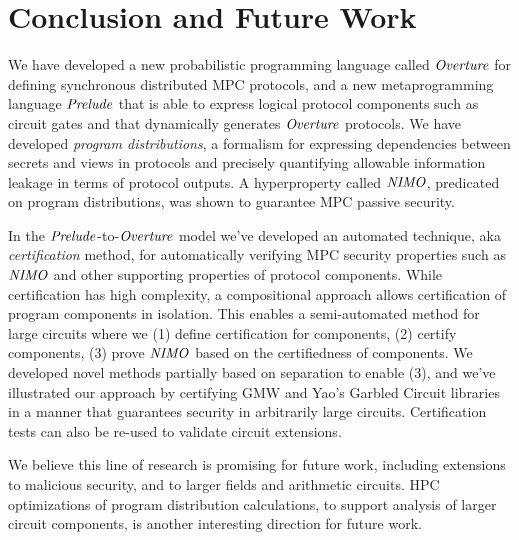 \section{Conclusion and Future Work}
\label{section-conclusion}

We have developed a new probabilistic programming language called
$\mathit{Overture}$ for defining synchronous distributed MPC protocols, and a new
metaprogramming language $\mathit{Prelude}$ that is able to express logical
protocol components such as circuit gates and that dynamically
generates $\mathit{Overture}$ protocols. We have developed \emph{program
distributions}, a formalism for expressing dependencies between
secrets and views in protocols and precisely quantifying allowable
information leakage in terms of protocol outputs. 
A hyperproperty called $\mathit{NIMO}$, predicated on program distributions,
was shown to guarantee MPC passive security. 

In the $\mathit{Prelude}$-to-$\mathit{Overture}$ model we've developed an automated
technique, aka \emph{certification} method, for automatically
verifying MPC security properties such as $\mathit{NIMO}$ and other supporting
properties of protocol components.  While certification has high
complexity, a compositional approach allows certification of program
components in isolation.  This enables a semi-automated method for
large circuits where we (1) define certification for components, (2)
certify components, (3) prove $\mathit{NIMO}$ based on the certifiedness of
components. We developed novel methods partially based on separation
to enable (3), and we've illustrated our approach by certifying GMW
and Yao's Garbled Circuit libraries in a manner that guarantees
security in arbitrarily large circuits. Certification tests can also
be re-used to validate circuit extensions.

We believe this line of research is promising for future work,
including extensions to malicious security, and to larger fields and
arithmetic circuits. HPC optimizations of program distribution
calculations, to support analysis of larger circuit components, is
another interesting direction for future work.
